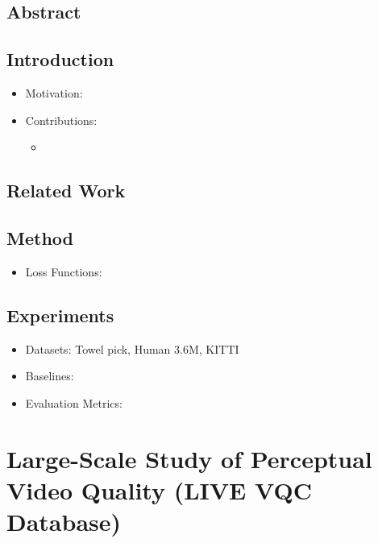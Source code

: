 \documentclass{article}
\begin{document}
    \subsection*{Abstract}

    \subsection{Introduction}\label{subsec:High_Fidelity_Video_Prediction_with_Large_Stochastic_Recurrent_Neural_Networks:introduction}
    \begin{itemize}
        \item Motivation:
        \item Contributions:
        \begin{itemize}
            \item
        \end{itemize}
    \end{itemize}

    \subsection{Related Work}\label{subsec:High_Fidelity_Video_Prediction_with_Large_Stochastic_Recurrent_Neural_Networks:related-work}

    \subsection{Method}\label{subsec:High_Fidelity_Video_Prediction_with_Large_Stochastic_Recurrent_Neural_Networks:method}
    \begin{itemize}
        \item Loss Functions:
    \end{itemize}

    \subsection{Experiments}\label{subsec:High_Fidelity_Video_Prediction_with_Large_Stochastic_Recurrent_Neural_Networks:experiments}
    \begin{itemize}
        \item Datasets: Towel pick, Human 3.6M, KITTI
        \item Baselines:
        \item Evaluation Metrics:
    \end{itemize}
    \newpage


    \section{Large-Scale Study of Perceptual Video Quality (LIVE VQC Database)}\label{sec:Large_Scale_Study_of_Perceptual_Video_Quality_(LIVE_VQC_Database)}
\end{document}

